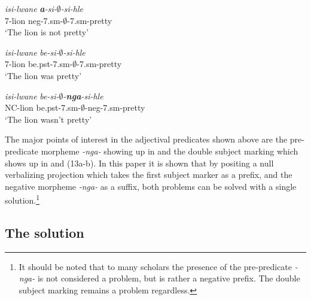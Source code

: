 \documentclass[output=paper]{langsci/langscibook}
\newcommand{\nga}[0]{\textit {-nga- }}
\begin{document}
{\begin{exe}
\begin{xlist}
\ex \gll \textit{isi-lwane} \textit{\textbf{a}-si-$\emptyset$-si-hle}\\
       7-lion {\sc neg}-7.{\sc sm}-$\emptyset$-7.{\sc sm}-pretty\\
    \glt `The lion is not pretty' 
\end{xlist}
\end{exe}

\begin{exe}
\ex \begin{xlist}
\ex \gll \textit{isi-lwane} \textit{be-si-$\emptyset$-si-hle}\\
       7-lion be.{\sc pst}-7.{\sc sm}-$\emptyset$-7.{\sc sm}-pretty\\
    \glt `The lion was pretty' 

\ex \gll \textit{isi-lwane} \textit{be-si-$\emptyset$-\textbf{nga}-si-hle}\\
       NC-lion be.{\sc pst}-7.{\sc sm}-$\emptyset$-{\sc neg}-7.{\sc sm}-pretty\\
    \glt `The lion wasn't pretty' 
\end{xlist}
\end{exe}

The major points of interest in the adjectival predicates shown above are the pre-predicate morpheme \nga showing up in  and the double subject marking which shows up in  and (13a-b). In this paper it is shown that by positing a null verbalizing projection which takes the first subject marker as a prefix, and the negative morpheme \nga as a suffix, both problems can be solved with a single solution.\footnote{It should be noted that to many scholars the presence of the pre-predicate \nga is not considered a problem, but is rather a negative prefix. The double subject marking remains a problem regardless.}

\subsection {The solution}

}
\end{document}
